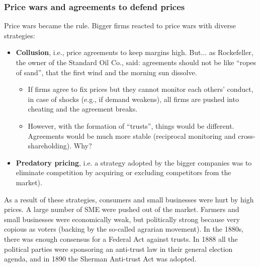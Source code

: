         \subsubsection{Price wars and agreements to defend prices}
            Price wars became the rule. Bigger firms reacted to price wars with diverse strategies: 
            \begin{itemize}
                \item \textbf{Collusion}, i.e., price agreements to keep margins high. But... as Rockefeller, the owner of the Standard Oil Co., said: agreements should not be like “ropes of sand”, that the first wind and the morning sun dissolve.  
                \begin{itemize}
                    \item If firms agree to fix prices but they cannot monitor each others’ conduct, in case of shocks (e.g., if demand weakens), all firms are pushed into cheating and the agreement breaks.
                    \item However, with the formation of “trusts”, things would be different. Agreements would be much more stable (reciprocal monitoring and cross-shareholding). Why?
                \end{itemize}
                \item \textbf{Predatory pricing}, i.e. a strategy adopted by the bigger companies was to eliminate competition by acquiring or excluding competitors from the market). 
            \end{itemize}


            As a result of these strategies, consumers and small businesses were hurt by high prices. 
            A large number of SME were pushed out of the market. Farmers and small businesses were economically weak, but politically strong because very copious as voters (backing by the so-called agrarian movement). 
            In the 1880s, there was enough consensus for a Federal Act against trusts. In 1888 all the political parties were sponsoring an anti-trust law in their general election agenda, and in 1890 the Sherman Anti-trust Act was adopted.

